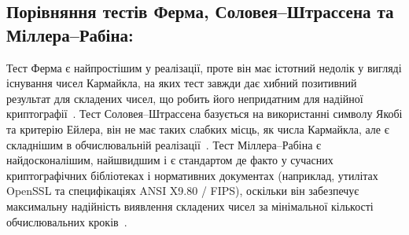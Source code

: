 \subsection{Порівняння тестів Ферма, Соловея--Штрассена та Міллера--Рабіна:}

Тест Ферма є найпростішим у реалізації, проте він має істотний недолік у вигляді існування чисел Кармайкла,
на яких тест завжди дає хибний позитивний результат для складених чисел, що робить його непридатним для
надійної криптографії~\cite{HAC}. Тест Соловея--Штрассена базується на використанні символу Якобі та
критерію Ейлера, він не має таких слабких місць, як числа Кармайкла, але є складнішим в обчислювальній
реалізації~\cite{HAC, RFC8017}. Тест Міллера--Рабіна є найдосконалішим, найшвидшим і є стандартом де
факто у сучасних криптографічних бібліотеках і нормативних документах (наприклад, утилітах OpenSSL та
специфікаціях ANSI X9.80 / FIPS), оскільки він забезпечує максимальну надійність виявлення складених чисел
за мінімальної кількості обчислювальних кроків~\cite{HAC, FIPS140-3, RFC8017}.
